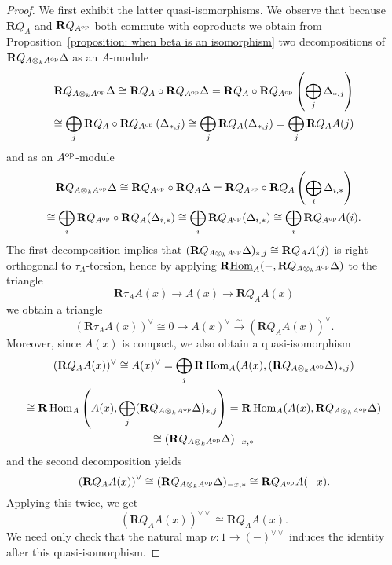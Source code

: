 \begin{proof}
  We first exhibit the latter quasi-isomorphisms.
  We observe that because \(\mathbf{R}Q_A\) and \(\mathbf{R}Q_{A^{\operatorname{op}}}\) both commute with coproducts we obtain from Proposition~\ref{proposition: when beta is an isomorphism} two decompositions of \(\mathbf{R}Q_{A \otimes_k A^{\operatorname{op}}} \Delta\) as an \(A\)-module
  \begin{gather*}
    \mathbf{R}Q_{A \otimes_k A^{\operatorname{op}}} \Delta \cong \mathbf{R}Q_{A} \circ \mathbf{R}Q_{A^{\operatorname{op}}} \Delta
    = \mathbf{R}Q_{A} \circ \mathbf{R}Q_{A^{\operatorname{op}}} \left(\bigoplus_j \Delta_{\ast,j}\right)\\
    \cong \bigoplus_j \mathbf{R}Q_A \circ \mathbf{R}Q_{A^{\operatorname{op}}} \left(\Delta_{\ast,j}\right) \cong \bigoplus_j \mathbf{R}Q_A (\Delta_{\ast,j}) = \bigoplus_j \mathbf{R}Q_A A(j)
  \end{gather*}
  and as an \(A^{\operatorname{op}}\)-module
  \begin{gather*}
    \mathbf{R}Q_{A \otimes_k A^{\operatorname{op}}} \Delta \cong \mathbf{R}Q_{A^{\operatorname{op}}} \circ \mathbf{R}Q_A \Delta
    = \mathbf{R}Q_{A^{\operatorname{op}}} \circ \mathbf{R}Q_A \left(\bigoplus_i \Delta_{i,\ast}\right)\\
    \cong \bigoplus_i \mathbf{R}Q_{A^{\operatorname{op}}} \circ \mathbf{R}Q_A (\Delta_{i,\ast})
    \cong \bigoplus_i \mathbf{R}Q_{A^{\operatorname{op}}} (\Delta_{i,\ast})
    \cong \bigoplus_i \mathbf{R}Q_{A^{\operatorname{op}}} A(i).
  \end{gather*}
  The first decomposition implies that \((\mathbf{R}Q_{A \otimes_k A^{\operatorname{op}}} \Delta)_{\ast,j} \cong \mathbf{R}Q_A A(j)\) is right orthogonal to \(\tau_A\)-torsion, hence by applying \(\mathbf{R}\underline{\operatorname{Hom}}_A(-, \mathbf{R}Q_{A \otimes_k A^{\operatorname{op}}} \Delta)\) to the triangle
  \[\mathbf{R}\tau_A A(x) \to A(x) \to \mathbf{R}Q_A A(x)\]
  we obtain a triangle %
  \[(\mathbf{R}\tau_A A(x))^\vee \cong 0 \to A(x)^\vee \overset{\sim}\to (\mathbf{R}Q_A A(x))^\vee.\]
  Moreover, since \(A(x)\) is compact, we also obtain a quasi-isomorphism
  \begin{gather*}
    (\mathbf{R}Q_A A(x))^\vee
    \cong A(x)^\vee
    = \bigoplus_j \mathbf{R}\operatorname{Hom}_A(A(x), (\mathbf{R}Q_{A \otimes_k A^{\operatorname{op}}}\Delta)_{\ast,j})\\
    \cong \mathbf{R}\operatorname{Hom}_A\left(A(x), \bigoplus_j(\mathbf{R}Q_{A \otimes_k A^{\operatorname{op}}}\Delta)_{\ast,j}\right)
    = \mathbf{R}\operatorname{Hom}_A(A(x), \mathbf{R}Q_{A \otimes_k A^{\operatorname{op}}} \Delta) \\
    \cong (\mathbf{R}Q_{A \otimes_k A^{\operatorname{op}}} \Delta)_{-x,\ast}
  \end{gather*}
  and the second decomposition yields
  \begin{displaymath}
    \left(\mathbf{R}Q_A A(x)\right)^\vee \cong (\mathbf{R}Q_{A \otimes_k A^{\operatorname{op}}} \Delta)_{-x,\ast} \cong \mathbf{R}Q_{A^{\operatorname{op}}} A(-x).
  \end{displaymath}
  Applying this twice, we get 
  \begin{displaymath}
    (\mathbf{R}Q_A A(x))^{\vee \vee} \cong \mathbf{R}Q_A A(x).
  \end{displaymath}
  We need only check that the natural map \(\nu : 1 \to (-)^{\vee \vee}\) induces the identity after this quasi-isomorphism.


\end{proof}
